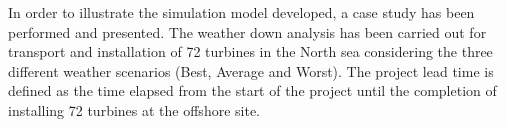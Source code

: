 In order to illustrate the simulation model developed, a case study has been performed and presented. The weather down analysis has been carried out for transport and installation of 72 turbines in the North sea considering the three different weather scenarios (Best, Average and Worst). The project lead time is defined as the time elapsed from the start of the project until the completion of installing 72 turbines at the offshore site. 

